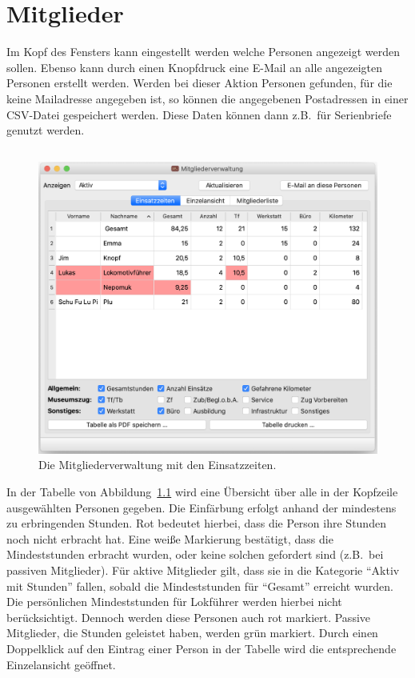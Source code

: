 \chapter{Mitglieder}\label{personal}
Im Kopf des Fensters kann eingestellt werden welche Personen angezeigt werden sollen.
Ebenso kann durch einen Knopfdruck eine E-Mail an alle angezeigten Personen erstellt werden.
Werden bei dieser Aktion Personen gefunden, für die keine Mailadresse angegeben ist,
so können die angegebenen Postadressen in einer CSV-Datei gespeichert werden.
Diese Daten können dann z.B.\ für Serienbriefe genutzt werden.

\section{}\label{personal:zeiten}
\begin{figure}[!h]
	\includegraphics[width=\textwidth]{img/personal_gesamt}
	\caption{Die Mitgliederverwaltung mit den Einsatzzeiten.}
	\label{fig:personal:zeiten}
\end{figure}
In der Tabelle von Abbildung~\ref{fig:personal:zeiten} wird eine Übersicht über alle in der Kopfzeile ausgewählten Personen gegeben.
Die Einfärbung erfolgt anhand der mindestens zu erbringenden Stunden.
Rot bedeutet hierbei, dass die Person ihre Stunden noch nicht erbracht hat.
Eine weiße Markierung bestätigt, dass die Mindeststunden erbracht wurden, oder keine solchen gefordert sind (z.B.\ bei passiven Mitglieder).
Für aktive Mitglieder gilt, dass sie in die Kategorie "`Aktiv mit Stunden"' fallen, sobald die Mindeststunden für "`Gesamt"' erreicht wurden.
Die persönlichen Mindeststunden für Lokführer werden hierbei nicht berücksichtigt.
Dennoch werden diese Personen auch rot markiert.
Passive Mitglieder, die Stunden geleistet haben, werden grün markiert.
Durch einen Doppelklick auf den Eintrag einer Person in der Tabelle wird die entsprechende Einzelansicht geöffnet.


